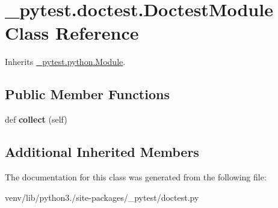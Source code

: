 \hypertarget{class__pytest_1_1doctest_1_1_doctest_module}{}\section{\+\_\+pytest.\+doctest.\+Doctest\+Module Class Reference}
\label{class__pytest_1_1doctest_1_1_doctest_module}


Inherits \hyperlink{class__pytest_1_1python_1_1_module}{\+\_\+pytest.\+python.\+Module}.

\subsection*{Public Member Functions}
\begin{DoxyCompactItemize}
\item 
\mbox{\label{class__pytest_1_1doctest_1_1_doctest_module_a6766924848d485194d25dbd8687054ad}} 
def {\bfseries collect} (self)
\end{DoxyCompactItemize}
\subsection*{Additional Inherited Members}


The documentation for this class was generated from the following file\+:\begin{DoxyCompactItemize}
\item 
venv/lib/python3./site-\/packages/\+\_\+pytest/doctest.\+py\end{DoxyCompactItemize}
